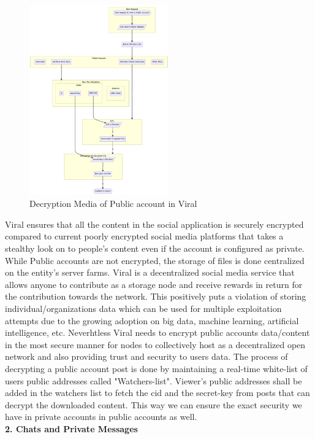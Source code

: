 \documentclass[conference]{IEEEtran}
\begin{document}
\begin{figure}[H]
\begin{center}
\includegraphics[width=6cm]{decryption-public}
\caption{Decryption Media of Public account in Viral}
\end{center}
\end{figure}

Viral ensures that all the content in the social application is securely encrypted compared to current poorly encrypted social media platforms that takes a stealthy look on to people's content even if the account is configured as private. While Public accounts are not encrypted, the storage of files is done centralized on the entity's server farms. Viral is a decentralized social media service that allows anyone to contribute as a storage node and receive rewards in return for the contribution towards the network. This positively puts a violation of storing individual/organizations data which can be used for multiple exploitation attempts due to the growing adoption on big data, machine learning, artificial intelligence, etc.  Neverhtless Viral needs to encrypt public accounts data/content in the most secure manner for nodes to collectively host as a decentralized open network and also providing trust and security to users data. The process of decrypting a public account post is done by maintaining a real-time white-list of users public addresses called "Watchers-list". Viewer's public addresses shall be added in the watchers list to fetch the cid and the secret-key from posts that can decrypt the downloaded content. This way we can ensure the exact security we have in private accounts in public accounts as well.\\


\textbf{2. Chats and Private Messages}\\
\end{document}
